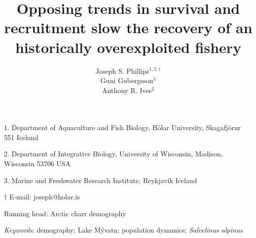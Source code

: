 \documentclass[11pt]{article}
\title{Opposing trends in survival and recruitment slow the recovery 
        of an historically overexploited fishery}
\author{
Joseph S. Phillips$^{1,2, \dagger}$ \\
Gu{\dh}ni Gu{\dh}bergsson$^{3}$ \\
Anthony R. Ives$^{2}$
}
\date{}
\begin{document}
\raggedright
\setlength\parindent{0.25in}

\maketitle


\noindent{} 1. Department of Aquaculture and Fish Biology, 
H\'{o}lar University, Skagafj\"{o}r{\dh}ur 551 Iceland

\noindent{} 2. Department of Integrative Biology, 
University of Wisconsin, Madison, Wisconsin 53706 USA

\noindent{} 3. Marine and Freshwater Research Institute, Reykjav\'{i}k Iceland

\noindent{} $\dagger$ E-mail: joseph@holar.is



\bigskip

Running head: {Arctic charr demography}

\linenumbers{}

\clearpage








\bigskip

\textit{Keywords}: {demography; Lake M\'{y}vatn; population dynamics; \emph{Salvelinus alpinus}}

\clearpage











\end{document}
